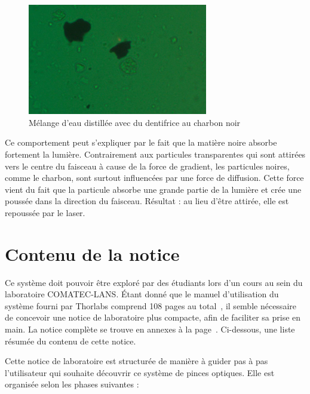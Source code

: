 \begin{figure}[H]
    \begin{center}
        \includegraphics[width=0.7\textwidth]{assets/figures/Notice de laboratoire/dentifrice_charbon.png}
    \end{center}
    \caption{Mélange d'eau distillée avec du dentifrice au charbon noir}
    \label{dentifrice_charbon}
\end{figure}

Ce comportement peut s'expliquer par le fait que la matière noire absorbe fortement la lumière. Contrairement aux particules transparentes qui sont attirées vers le centre du faisceau à cause de la force de gradient, les particules noires, comme le charbon, sont surtout influencées par une force de diffusion. Cette force vient du fait que la particule absorbe une grande partie de la lumière et crée une poussée dans la direction du faisceau. Résultat : au lieu d'être attirée, elle est repoussée par le laser.

\newpage
\section{Contenu de la notice}
Ce système doit pouvoir être exploré par des étudiants lors d'un cours au sein du laboratoire COMATEC-LANS. Étant donné que le manuel d'utilisation du système fourni par Thorlabs comprend 108 pages au total~\cite{manualPortableOpticalTweezers}, il semble nécessaire de concevoir une notice de laboratoire plus compacte, afin de faciliter sa prise en main. La notice complète se trouve en annexes à la page~\pageref{annexe:notice_labo_Kinesis_ThorCam}. Ci-dessous, une liste résumée du contenu de cette notice.

Cette notice de laboratoire est structurée de manière à guider pas à pas l'utilisateur qui souhaite découvrir ce système de pinces optiques.
Elle est organisée selon les phases suivantes :

